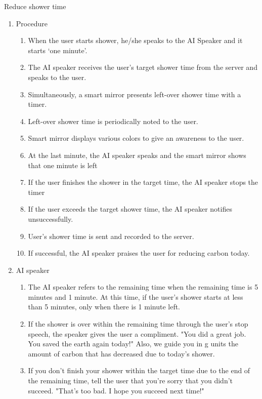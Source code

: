 \documentclass[11pt, conference]{IEEEtran}
\begin{document}
\begin{enumerate}[label=\arabic*]
\begin{enumerate}[label=\alph*]
        Reduce shower time
        \begin{enumerate}
            \item Procedure
            \begin{enumerate}[label=\arabic*]
                \item When the user starts shower, he/she speaks to the AI Speaker and it starts ‘one minute’.
                \item The AI speaker receives the user’s target shower time from the server and speaks to the user.
                \item Simultaneously, a smart mirror presents left-over shower time with a timer.
                \item Left-over shower time is periodically noted to the user.
                \item Smart mirror displays various colors to give an awareness to the user.
                \item At the last minute, the AI speaker speaks and the smart mirror shows that one minute is left
                \item If the user finishes the shower in the target time, the AI speaker stops the timer 
                \item If the user exceeds the target shower time, the AI speaker notifies unsuccessfully.
                \item User’s shower time is sent and recorded to the server.
                \item If successful, the AI speaker praises the user for reducing carbon today.
            \end{enumerate}
            \item AI speaker
            \begin{enumerate}[label=\arabic*]
                \item The AI speaker refers to the remaining time when the remaining time is 5 minutes and 1 minute. At this time, if the user's shower starts at less than 5 minutes, only when there is 1 minute left.
                \item If the shower is over within the remaining time through the user's stop speech, the speaker gives the user a compliment. "You did a great job. You saved the earth again today!" Also, we guide you in g units the amount of carbon that has decreased due to today's shower.
                \item If you don't finish your shower within the target time due to the end of the remaining time, tell the user that you're sorry that you didn't succeed. "That's too bad. I hope you succeed next time!"

\end{enumerate}
\end{enumerate}
\end{enumerate}
\end{enumerate}
\end{document}
